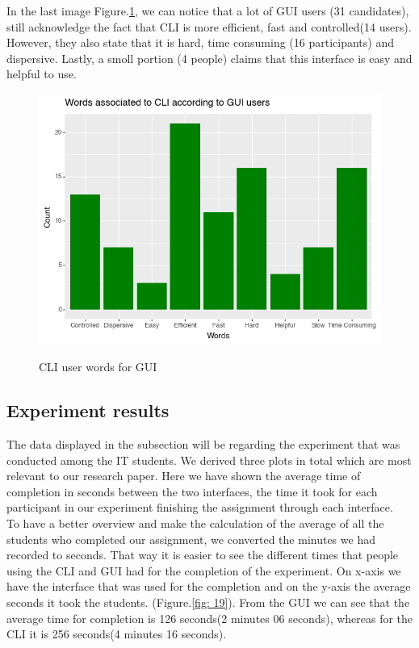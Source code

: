 \documentclass[]{report}
\begin{document}
	In the last image Figure.\ref{fig: 18}, we can notice that a lot of GUI users (31 candidates), still acknowledge the fact that CLI is more efficient, fast and controlled(14 users). However, they also state that it is hard, time consuming (16 participants) and dispersive. Lastly, a smoll portion (4 people) claims that this interface is easy and helpful to use.
	
	
	\begin{figure}[H]
		\centering
		\includegraphics[width=0.75\linewidth]{WordsCLIFromGUI}\\
		\caption{CLI user words for GUI}
		\label{fig: 18}
	\end{figure}
\newpage

\subsection{Experiment results}
The data displayed in the subsection will be regarding the experiment that was conducted among the IT students. We derived three plots in total which are most relevant to our research paper. Here we have shown the average time of completion in seconds between the two interfaces, the time it took for each participant in our experiment finishing the assignment through each interface.\\

		
	To have a better overview and make the calculation of the average of all the students who completed our assignment, we converted the minutes we had recorded to seconds. That way it is easier to see the different times that people using the CLI and GUI had for the completion of the experiment. On x-axis we have the interface that was used for the completion and on the y-axis the average seconds it took the students. (Figure.\ref{fig: 19}). From the GUI we can see that the average time for completion is 126 seconds(2 minutes 06 seconds), whereas for the CLI it is 256 seconds(4 minutes 16 seconds).
\end{document}
